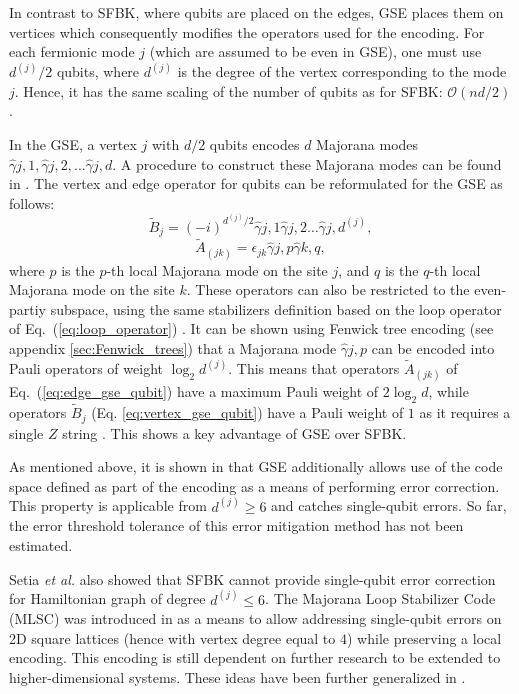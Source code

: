 In contrast to SFBK, where qubits are placed on the edges, GSE places them on vertices which consequently modifies the operators used for the encoding. For each fermionic mode $j$ (which are assumed to be even in GSE), one must use $d^{(j)}/2$ qubits, where $d^{(j)}$ is the degree of the vertex corresponding to the mode $j$. Hence, it has the same scaling of the number of qubits as for SFBK: $\mathcal{O}(nd/2)$.

In the GSE, a vertex $j$ with $d/2$ qubits encodes $d$ Majorana modes $\hat{\gamma}{j, 1}, \hat{\gamma}{j, 2},...\hat{\gamma}{j, d}$. A procedure to construct these Majorana modes can be found in \cite{Setia2018}. The vertex and edge operator for qubits can be reformulated for the GSE as follows: 
\begin{equation}\label{eq:vertex_gse_qubit}
\tilde{B}_{j} = (-i)^{d^{(j)}/2}\hat{\gamma}{j, 1}\hat{\gamma}{j, 2} \dots\hat{\gamma}{j, d^{(j)}},
\end{equation}
\begin{equation} \label{eq:edge_gse_qubit}
\tilde{A}_{(j k)} =\epsilon_{j k} \hat{\gamma}{j, p} \hat{\gamma}{k, q},
\end{equation}
where $p$ is the $p$-th local Majorana mode on the site $j$, and $q$ is the $q$-th local Majorana mode on the site $k$.  These operators can also be restricted to the even-partiy subspace, using the same stabilizers  definition based on the loop operator of Eq.~(\ref{eq:loop_operator}) \cite{Setia2019}. It can be shown using Fenwick tree encoding \cite{Havlek2017} (see appendix \ref{sec:Fenwick_trees}) that a Majorana mode $\hat{\gamma}{j, p}$ can be encoded into Pauli operators of weight $\log_2 d^{(j)}$. This means that operators $\tilde{A}_{(j k)}$ of Eq.~(\ref{eq:edge_gse_qubit}) have a maximum Pauli weight of $2\log_2 d$, while operators $\tilde{B}_{j}$ (Eq. \ref{eq:vertex_gse_qubit}) have a Pauli weight of $1$ as it requires a single $Z$ string \cite{Havlek2017}. This shows a key advantage of GSE over SFBK. 

As mentioned above, it is shown in \cite{Setia2019} that GSE additionally allows use of the code space defined as part of the encoding as a means of performing error correction. This property is applicable from $ d^{(j)} \geq 6$ and catches single-qubit errors. So far, the error threshold tolerance of this error mitigation method has not been estimated.

Setia {\it et al.} \cite{Setia2019} also showed that SFBK cannot provide single-qubit error correction for Hamiltonian graph of degree $ d^{(j)} \leq 6$.  The Majorana Loop Stabilizer Code (MLSC) was introduced in \cite{Jiang2019} as a means to allow addressing single-qubit errors on 2D square lattices (hence with vertex degree equal to $4$) while preserving a local encoding. This encoding is still dependent on further research to be extended to higher-dimensional systems. These ideas have been further generalized in \cite{Chien2020}.    

